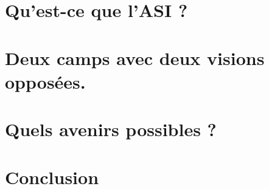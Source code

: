 \documentclass[12pt,a4paper]{article}
\begin{document}
\section{Qu'est-ce que l'ASI ?}

\subsection{}

\subsection{}

\subsection{}

\section{Deux camps avec deux visions opposées.}

\subsection{}

\subsection{}

\section{Quels avenirs possibles ?}

\subsection{}

\subsection{}

\subsection{}

\section{Conclusion}
\end{document}
